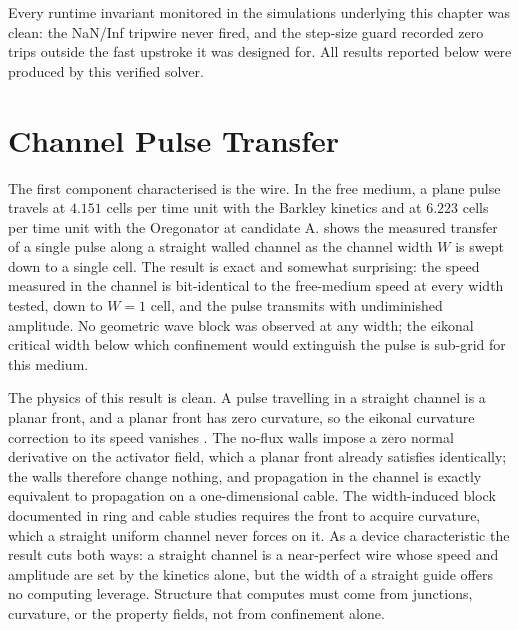 Every runtime invariant monitored in the simulations underlying this chapter was clean: the NaN/Inf tripwire never fired, and the step-size guard recorded zero trips outside the fast upstroke it was designed for.
All results reported below were produced by this verified solver.

\section{Channel Pulse Transfer}
\label{sec:res_channel}

The first component characterised is the wire.
In the free medium, a plane pulse travels at $4.151$ cells per time unit with the Barkley kinetics and at $6.223$ cells per time unit with the Oregonator at candidate A.
 shows the measured transfer of a single pulse along a straight walled channel as the channel width $W$ is swept down to a single cell.
The result is exact and somewhat surprising: the speed measured in the channel is bit-identical to the free-medium speed at every width tested, down to $W = 1$ cell, and the pulse transmits with undiminished amplitude.
No geometric wave block was observed at any width; the eikonal critical width below which confinement would extinguish the pulse is sub-grid for this medium.

The physics of this result is clean.
A pulse travelling in a straight channel is a planar front, and a planar front has zero curvature, so the eikonal curvature correction to its speed vanishes \cite{keener1991eikonal}.
The no-flux walls impose a zero normal derivative on the activator field, which a planar front already satisfies identically; the walls therefore change nothing, and propagation in the channel is exactly equivalent to propagation on a one-dimensional cable.
The width-induced block documented in ring and cable studies \cite{courtemanche1993instabilities} requires the front to acquire curvature, which a straight uniform channel never forces on it.
As a device characteristic the result cuts both ways: a straight channel is a near-perfect wire whose speed and amplitude are set by the kinetics alone, but the width of a straight guide offers no computing leverage.
Structure that computes must come from junctions, curvature, or the property fields, not from confinement alone.

